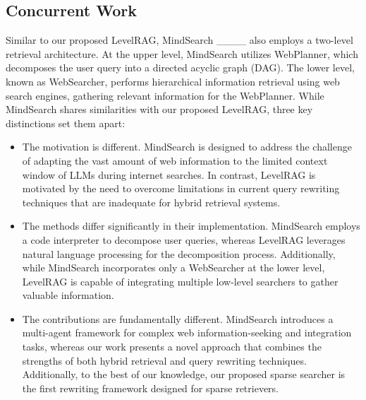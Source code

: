 \subsection{Concurrent Work}
Similar to our proposed LevelRAG, MindSearch ____ also employs a two-level retrieval architecture. At the upper level, MindSearch utilizes WebPlanner, which decomposes the user query into a directed acyclic graph (DAG). The lower level, known as WebSearcher, performs hierarchical information retrieval using web search engines, gathering relevant information for the WebPlanner. While MindSearch shares similarities with our proposed LevelRAG, three key distinctions set them apart:

\begin{itemize}
    \item The motivation is different. MindSearch is designed to address the challenge of adapting the vast amount of web information to the limited context window of LLMs during internet searches. In contrast, LevelRAG is motivated by the need to overcome limitations in current query rewriting techniques that are inadequate for hybrid retrieval systems.
    \item The methods differ significantly in their implementation. MindSearch employs a code interpreter to decompose user queries, whereas LevelRAG leverages natural language processing for the decomposition process. Additionally, while MindSearch incorporates only a WebSearcher at the lower level, LevelRAG is capable of integrating multiple low-level searchers to gather valuable information.
    \item The contributions are fundamentally different. MindSearch introduces a multi-agent framework for complex web information-seeking and integration tasks, whereas our work presents a novel approach that combines the strengths of both hybrid retrieval and query rewriting techniques. Additionally, to the best of our knowledge, our proposed sparse searcher is the first rewriting framework designed for sparse retrievers.
\end{itemize}